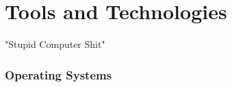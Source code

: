 
\part*{Tools and Technologies}

"Stupid Computer Shit"



\toclineskip
\section{Operating Systems}




